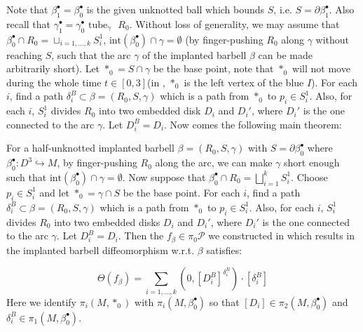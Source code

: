Note that $\beta_1^\bullet=\beta_0^\bullet$ is the given unknotted ball which bounds $S$, i.e. $S=\partial\beta_1^\bullet$. Also recall that $\gamma_1^\bullet=\gamma_0^\bullet \text{ tube}_\gamma \text{ }R_0$. Without loss of generality, we may assume that $\beta_0^\bullet \cap R_0=\sqcup_{i=1,...,k} S_i^1$, $\text{int}(\beta_0^\bullet)\cap \gamma=\emptyset  $ (by finger-pushing $R_0$ along $\gamma$ without reaching $S$, such that the arc $\gamma$ of the implanted barbell $\beta$ can be made arbitrarily short). Let $*_0=S\cap \gamma$ be the base point, note that $*_0$ will not move during the whole time $t\in [0,3]$(in , $*_0$ is the left vertex of the blue $I$). For each $i$, find a path $\delta^B_i\subset \beta=(R_0, S,\gamma)$ which is a path from $*_0$ to $p_i\in S_i^1$. Also, for each $i$, $S_i^1$ divides $R_0$ into two embedded disk $D_i$ and $D_i'$, where $D_i'$ is the one connected to the arc $\gamma$. Let $D^B_i=D_i$. Now comes the following main theorem:

\begin{theorem} \label{thm:main-calculation}
    For a half-unknotted implanted barbell $\beta=(R_0, S, \gamma)$ with $S=\partial \beta_0^\bullet$ where $\beta_0^\bullet: D^3\hookrightarrow M$, by finger-pushing $R_0$ along the arc, we can make $\gamma$ short enough such that $\text{int}(\beta_0^\bullet)\cap \gamma =\emptyset$. Now suppose that $\beta_0^\bullet \cap R_0=\bigsqcup _{i=1}^k S_i^1$. Choose $p_i\in S_i^1$ and let $*_0=\gamma\cap S$ be the base point. For each $i$, find a path $\delta^B_i\subset \beta=(R_0, S,\gamma)$ which is a path from $*_0$ to $p_i\in S_i^1$. Also, for each $i$, $S_i^1$ divides $R_0$ into two embedded disks $D_i$ and $D_i'$, where $D_i'$ is the one connected to the arc $\gamma$. Let $D^B_i=D_i$. Then the $f_\beta\in \pi_0\mathcal{P}$ we constructed in  which results in the implanted barbell diffeomorphism w.r.t. $\beta$ satisfies:
    
    $$\Theta(f_\beta)=\sum_{i=1,...,k} (0, [D^B_i]^{\delta_i^B})\cdot  [\delta_i^B]$$
    Here we identify $\pi_i(M,*_0)$ with $\pi_i(M, \beta_0^\bullet)$ so that $[D_i]\in \pi_2(M,\beta_0^\bullet)$ and $\delta_i^B\in \pi_1(M,\beta_0^\bullet)$. 
\end{theorem}


